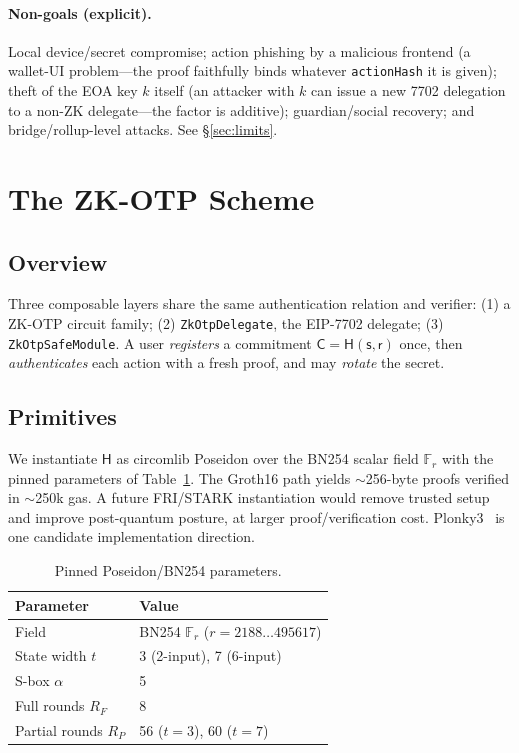 \documentclass[11pt]{article}
\theoremstyle{definition}
\theoremstyle{plain}
\newcommand{\Hash}{\mathsf{H}}       %
\newcommand{\Fr}{\mathbb{F}_r}       %
\newcommand{\secret}{\mathsf{s}}
\newcommand{\salt}{\mathsf{r}}
\newcommand{\commit}{\mathsf{C}}
\begin{document}
\paragraph{Non-goals (explicit).} Local device/secret compromise; action phishing
by a malicious frontend (a wallet-UI problem---the proof faithfully binds whatever
\texttt{actionHash} it is given); theft of the EOA key $k$ itself (an attacker with
$k$ can issue a new 7702 delegation to a non-ZK delegate---the factor is additive);
guardian/social recovery; and bridge/rollup-level attacks. See \S\ref{sec:limits}.

\section{The ZK-OTP Scheme}
\label{sec:scheme}

\subsection{Overview}
Three composable layers share the same authentication relation and verifier:
(1) a ZK-OTP circuit family; (2) \texttt{ZkOtpDelegate}, the EIP-7702 delegate; (3)
\texttt{ZkOtpSafeModule}. A user \emph{registers} a commitment
$\commit = \Hash(\secret, \salt)$ once, then \emph{authenticates} each action with a
fresh proof, and may \emph{rotate} the secret.

\subsection{Primitives}
\label{sec:prims}
We instantiate $\Hash$ as circomlib Poseidon over the BN254 scalar field $\Fr$ with the pinned
parameters of Table~\ref{tab:params}. The Groth16 path yields $\sim$256-byte proofs
verified in $\sim$250k gas. A future FRI/STARK instantiation would remove trusted
setup and improve post-quantum posture, at larger proof/verification cost. Plonky3~\cite{plonky3}
is one candidate implementation direction.

\begin{table}[t]
\centering
\caption{Pinned Poseidon/BN254 parameters.}
\label{tab:params}
\begin{tabular}{ll}
\toprule
Parameter & Value \\
\midrule
Field & BN254 $\Fr$ ($r = 2188\ldots495617$) \\
State width $t$ & 3 (2-input), 7 (6-input) \\
S-box $\alpha$ & 5 \\
Full rounds $R_F$ & 8 \\
Partial rounds $R_P$ & 56 ($t{=}3$), 60 ($t{=}7$) \\
\bottomrule
\end{tabular}
\end{table}
\end{document}

